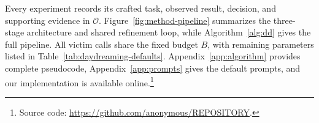 \documentclass[letterpaper,twocolumn,10pt]{article}
\newcommand{\method}{\texttt{Daydreaming}\xspace}
\begin{document}
Every experiment records its crafted task, observed result, decision, and supporting evidence in $\mathcal{O}$. 
Figure~\ref{fig:method-pipeline} summarizes the three-stage architecture and shared refinement loop, while 
Algorithm~\ref{alg:dd} gives the full pipeline. All victim calls share the fixed budget $B$, with remaining parameters listed in Table~\ref{tab:daydreaming-defaults}. Appendix~\ref{app:algorithm} provides complete pseudocode, Appendix~\ref{app:prompts} gives the default prompts, and our implementation is available online.\footnote{Source code: \url{https://github.com/anonymous/REPOSITORY}.}



\end{document}
